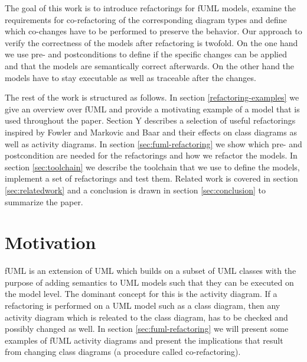 \documentclass{llncs}
\begin{document}

The goal of this work is to introduce refactorings for fUML models, examine the requirements for co-refactoring of the
corresponding diagram types and define which co-changes have to be performed to preserve the behavior. Our approach to
verify
the correctness of the models after refactoring is twofold. On the one hand we use pre- and postconditions
\cite{rob99} to define if the specific changes can be applied and that the models are semantically correct afterwards.
On the other hand the models have to stay executable as well as traceable after the changes.



The rest of the work is structured as follows. In section \ref{refactoring-examples} we give an overview over fUML and provide
a motivating
example of a model that is used throughout the paper. Section Y describes a selection of useful refactorings inspired by
Fowler \cite{fow99} and Markovic and Baar \cite{DBLP:journals/sosym/MarkovicB08} and their effects on class diagrams as
well as activity diagrams. In section \ref{sec:fuml-refactoring} we show which pre- and postcondition are needed for the refactorings and
how we refactor the models. In section \ref{sec:toolchain} we describe the toolchain that we use to define the models, 
implement a set of refactorings and test them. Related work is covered in section \ref{sec:relatedwork} and a conclusion is drawn in 
section \ref{sec:conclusion} to summarize the paper.



\section{Motivation}
fUML is an extension of UML which builds on a subset of UML classes with the purpose of adding semantics to UML models 
such that they can be executed on the model level. The dominant concept for this is the activity diagram. If a refactoring 
is performed on a UML model such as a class diagram, then any activity diagram which is releated to the class diagram, has 
to be checked and possibly changed as well. In section \ref{sec:fuml-refactoring} we will present some examples of fUML 
activity diagrams and present the implications that result from changing class 
diagrams (a procedure called co-refactoring).
\end{document}
